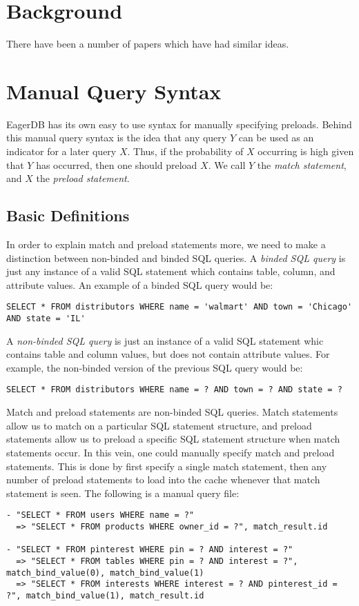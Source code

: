 \documentclass[12pt]{article}
\begin{document}
\section{Background}

There have been a number of papers which have had similar ideas.


\section{Manual Query Syntax}

EagerDB has its own easy to use syntax for manually specifying preloads. Behind this manual query syntax is the idea that any query $Y$ can be used as an indicator for a later query $X$. Thus, if the probability of $X$ occurring is high given that $Y$ has occurred, then one should preload $X$. We call $Y$ the \emph{match statement}, and $X$ the \emph{preload statement}.

\subsection{Basic Definitions}

In order to explain match and preload statements more, we need to make a distinction between non-binded and binded SQL queries. A \emph{binded SQL query} is just any instance of a valid SQL statement which contains table, column, and attribute values. An example of a binded SQL query would be:

\begin{lstlisting}
SELECT * FROM distributors WHERE name = 'walmart' AND town = 'Chicago' AND state = 'IL'
\end{lstlisting}

A \emph{non-binded SQL query} is just an instance of a valid SQL statement whic contains table and column values, but does not contain attribute values. For example, the non-binded version of the previous SQL query would be:

\begin{lstlisting}
SELECT * FROM distributors WHERE name = ? AND town = ? AND state = ?
\end{lstlisting}

Match and preload statements are non-binded SQL queries. Match statements allow us to match on a particular SQL statement structure, and preload statements allow us to preload a specific SQL statement structure when match statements occur. In this vein, one could manually specify match and preload statements. This is done by first specify a single match statement, then any number of preload statements to load into the cache whenever that match statement is seen. The following is a manual query file:

\begin{lstlisting}
- "SELECT * FROM users WHERE name = ?"
  => "SELECT * FROM products WHERE owner_id = ?", match_result.id

- "SELECT * FROM pinterest WHERE pin = ? AND interest = ?"
  => "SELECT * FROM tables WHERE pin = ? AND interest = ?", match_bind_value(0), match_bind_value(1)
  => "SELECT * FROM interests WHERE interest = ? AND pinterest_id = ?", match_bind_value(1), match_result.id
\end{lstlisting}
\end{document}
